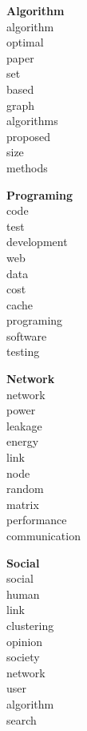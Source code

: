\begin{minipage}{.196\textwidth}
\centering
\textbf{Algorithm} \\
algorithm \\
optimal \\
paper \\
set \\
based \\
graph \\
algorithms \\
proposed \\
size \\
methods
\end{minipage}
\begin{minipage}{.196\textwidth}
\centering
\textbf{Programing} \\
code \\
test \\
development \\
web \\
data \\
cost \\
cache \\
programing \\
software \\
testing
\end{minipage}
\begin{minipage}{.196\textwidth}
\centering
\textbf{Network} \\
network \\
power \\
leakage \\
energy \\
link \\
node \\
random \\
matrix \\
performance \\
communication
\end{minipage}
\begin{minipage}{.196\textwidth}
\centering
\textbf{Social} \\
social \\
human \\
link \\
clustering \\
opinion \\
society\\
network \\
user \\
algorithm \\
search
\end{minipage}
